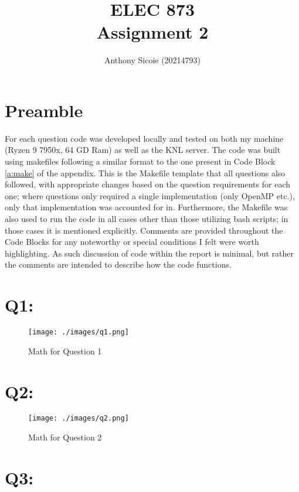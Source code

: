 \documentclass[11pt]{article}
\title{%
  ELEC 873 \\
Assignment 2}
\author{Anthony Sicoie (20214793)}
\begin{document}
\maketitle

\section*{Preamble}

For each question code was developed locally and tested on both my machine (Ryzen 9 7950x, 64 GD Ram) as well as the KNL server.
The code was built using makefiles following a similar format to the one present in Code Block \ref{a:make} of the appendix.
This is the Makefile template that all questions also followed, with appropriate changes based on the question requirements for each one; where questions only required a single implementation (only OpenMP etc.), only that implementation was accounted for in.
Furthermore, the Makefile was also used to run the code in all cases other than those utilizing bash scripts; in those cases it is mentioned explicitly.
Comments are provided throughout the Code Blocks for any noteworthy or special conditions I felt were worth highlighting.
As such discussion of code within the report is minimal, but rather the comments are intended to describe how the code functions.


\section*{Q1:}

\begin{figure}[H]
\centering
    \texttt{[image: ./images/q1.png]}
\caption{Math for Question 1}
\label{fig:q1}
\end{figure}

\newpage

\section*{Q2:}

\begin{figure}[H]
\centering
    \texttt{[image: ./images/q2.png]}
\caption{Math for Question 2}
\label{fig:q2}
\end{figure}

\newpage

\section*{Q3:}
\end{document}

